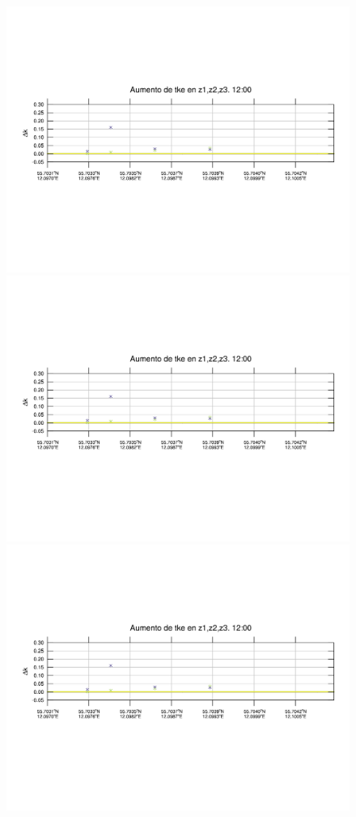 \begin{figure}[H]
	\centering
	\includegraphics[width=0.90\linewidth,trim={12mm 84mm 10mm 74mm},page=1,clip]{Imagenes/06/bol_da/delta_tke}\\%
	\includegraphics[width=0.90\linewidth,trim={12mm 84mm 10mm 74mm},page=13,clip]{Imagenes/06/bol_da/delta_tke}\\%
	\includegraphics[width=0.90\linewidth,trim={12mm 84mm 10mm 74mm},page=25,clip]{Imagenes/06/bol_da/delta_tke}\\%

\end{figure}
